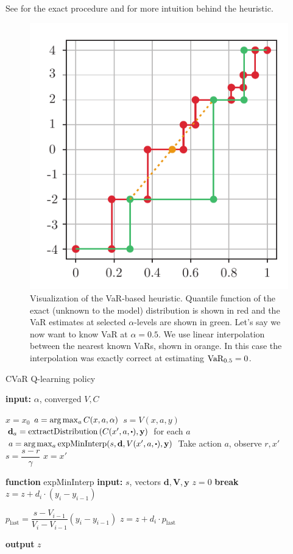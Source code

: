 See  for the exact procedure and  for more intuition behind the heuristic.

\begin{figure}[h]
\center
\includegraphics[width=0.5\linewidth]{gfx/heuristic.pdf}
\caption{Visualization of the VaR-based heuristic. Quantile function of the exact (unknown to the model) distribution is shown in red and the VaR estimates at selected $\alpha$-levels are shown in green. Let's say we now want to know VaR at $\alpha=0.5$. We use linear interpolation between the nearest known VaRs, shown in orange. In this case the interpolation was exactly correct at estimating $\text{VaR}_{0.5}=0$.}
\label{fig:heuristic}
\end{figure}


\begin{algorithm}
\caption{CVaR Q-learning policy}\label{alg:varbasedpolicy}
\begin{algorithmic}
    \STATE \textbf{input:} $\alpha$, converged $V, C$
    		
	\STATE $x = x_0$
	\STATE $a = \text{arg}\max_a C(x, a, \alpha)$
	\STATE $s = V(x, a, y)$
	\STATE $\mathbf{d}_a = \text{extractDistribution}\bround{C(x', a, \bigcdot), \mathbf{y}}$ for each $a$
	\STATE $a = \argmax_a \text{expMinInterp}(s, \mathbf{d}, V(x', a, \bigcdot), \mathbf{y})$
	\STATE Take action $a$, observe $r, x'$
	\STATE $s = \dfrac{s-r}{\gamma}$
	\STATE $x = x'$
	\ENDWHILE

\hrulefill

	\STATE {}
	\STATE \textbf{function} expMinInterp  
\bindent
    \STATE \textbf{input:} $s$, vectors $\mathbf{d}, \mathbf{V}, \mathbf{y}$
    \STATE $z = 0$
		\STATE \textbf{break}
		\ENDIF
		\STATE $z = z + d_i\cdot(y_i - y_{i-1})$
	\ENDFOR
	
	\STATE $p_{\text{last}} = \dfrac{s - V_{i-1}}{V_{i}-V_{i-1}}(y_i - y_{i-1})$
	\STATE $z = z + d_i \cdot p_{\text{last}}$
	
	\STATE \textbf{output} $z$
\eindent
\end{algorithmic}
\end{algorithm}


